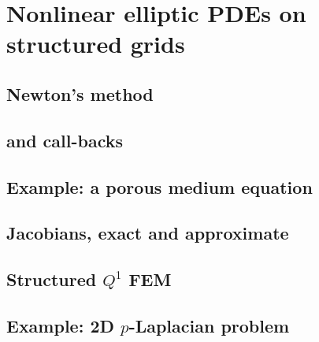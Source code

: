 
\chapter{Nonlinear elliptic PDEs on structured grids}
\label{chap:nonlinear}

\section{Newton's method}

\section{\pSNES and call-backs}


\section{Example: a porous medium equation}

\section{Jacobians, exact and approximate}

\section{Structured $Q^1$ FEM}

\section{Example: 2D $p$-Laplacian problem}
